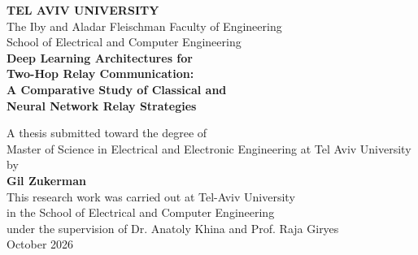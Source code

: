 \documentclass[12pt,a4paper,oneside]{book}
\theoremstyle{definition}
\begin{document}
\begin{titlepage}
\begin{center}
\vspace*{0.5cm}

{\LARGE\textbf{TEL AVIV UNIVERSITY}}\\[6pt]
{\large The Iby and Aladar Fleischman Faculty of Engineering}\\[4pt]
{\large School of Electrical and Computer Engineering}\\[2cm]

{\LARGE\bfseries
Deep Learning Architectures for\\[6pt]
Two-Hop Relay Communication:\\[6pt]
A Comparative Study of Classical and\\[6pt]
Neural Network Relay Strategies\\[2cm]
}

{\large A thesis submitted toward the degree of}\\[4pt]
{\large Master of Science in Electrical and Electronic Engineering \newline at Tel Aviv University}\\[1.5cm]

{\large by}\\[6pt]
{\Large\bfseries Gil Zukerman}\\[1.5cm]
This research work was carried out at Tel-Aviv University\\
in the School of Electrical and Computer Engineering\\
under the supervision of Dr. Anatoly Khina and Prof. Raja Giryes\\
\vfill
{\large{October 2026}}\\[1.5cm]
\vfill
\end{center}
\end{titlepage}




\frontmatter
{}
\hypersetup{pageanchor=true}



\end{document}
